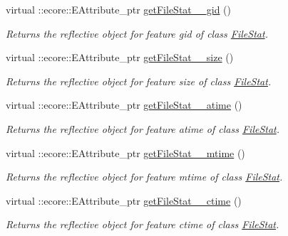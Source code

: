 \begin{DoxyCompactItemize}
virtual ::ecore::EAttribute\_\-ptr \hyperlink{classFMS__Data_1_1FMS__DataPackage_a9d6e6ff5f92219def95304220d79ed5c}{getFileStat\_\-\_\-gid} ()
\begin{DoxyCompactList}\small\item\em Returns the reflective object for feature gid of class \hyperlink{classFMS__Data_1_1FileStat}{FileStat}. \item\end{DoxyCompactList}\item 
virtual ::ecore::EAttribute\_\-ptr \hyperlink{classFMS__Data_1_1FMS__DataPackage_a1e699b59c0fba5fe719e9917691a9242}{getFileStat\_\-\_\-size} ()
\begin{DoxyCompactList}\small\item\em Returns the reflective object for feature size of class \hyperlink{classFMS__Data_1_1FileStat}{FileStat}. \item\end{DoxyCompactList}\item 
virtual ::ecore::EAttribute\_\-ptr \hyperlink{classFMS__Data_1_1FMS__DataPackage_a42230bd4f92282709167a91cc7093f3a}{getFileStat\_\-\_\-atime} ()
\begin{DoxyCompactList}\small\item\em Returns the reflective object for feature atime of class \hyperlink{classFMS__Data_1_1FileStat}{FileStat}. \item\end{DoxyCompactList}\item 
virtual ::ecore::EAttribute\_\-ptr \hyperlink{classFMS__Data_1_1FMS__DataPackage_a5a3a042a1b9b80a481fd58a5ce87721c}{getFileStat\_\-\_\-mtime} ()
\begin{DoxyCompactList}\small\item\em Returns the reflective object for feature mtime of class \hyperlink{classFMS__Data_1_1FileStat}{FileStat}. \item\end{DoxyCompactList}\item 
virtual ::ecore::EAttribute\_\-ptr \hyperlink{classFMS__Data_1_1FMS__DataPackage_ad295241b9c7f98e00620612370828869}{getFileStat\_\-\_\-ctime} ()
\begin{DoxyCompactList}\small\item\em Returns the reflective object for feature ctime of class \hyperlink{classFMS__Data_1_1FileStat}{FileStat}. \item\end{DoxyCompactList}\item 

\end{DoxyCompactItemize}
